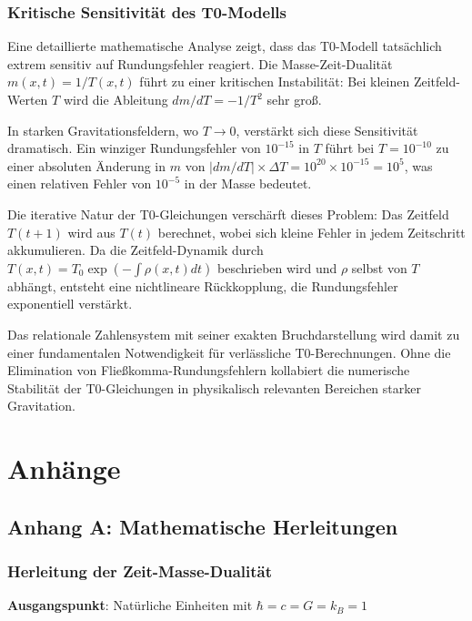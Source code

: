 \documentclass[12pt,a4paper]{report}
\begin{document}
	\subsection{Kritische Sensitivit{\"a}t des T0-Modells}
	
	Eine detaillierte mathematische Analyse zeigt, dass das T0-Modell tats{\"a}chlich extrem sensitiv auf Rundungsfehler reagiert. Die Masse-Zeit-Dualit{\"a}t $m(x,t) = 1/T(x,t)$ f{\"u}hrt zu einer kritischen Instabilit{\"a}t: Bei kleinen Zeitfeld-Werten $T$ wird die Ableitung $dm/dT = -1/T^2$ sehr gro{\ss}.
	
	In starken Gravitationsfeldern, wo $T \to 0$, verst{\"a}rkt sich diese Sensitivit{\"a}t dramatisch. Ein winziger Rundungsfehler von $10^{-15}$ in $T$ f{\"u}hrt bei $T = 10^{-10}$ zu einer absoluten {\"A}nderung in $m$ von $|dm/dT| \times \Delta T = 10^{20} \times 10^{-15} = 10^5$, was einen relativen Fehler von $10^{-5}$ in der Masse bedeutet.
	
	Die iterative Natur der T0-Gleichungen versch{\"a}rft dieses Problem: Das Zeitfeld $T(t+1)$ wird aus $T(t)$ berechnet, wobei sich kleine Fehler in jedem Zeitschritt akkumulieren. Da die Zeitfeld-Dynamik durch $T(x,t) = T_0 \exp(-\int\rho(x,t)dt)$ beschrieben wird und $\rho$ selbst von $T$ abh{\"a}ngt, entsteht eine nichtlineare R{\"u}ckkopplung, die Rundungsfehler exponentiell verst{\"a}rkt.
	
	Das relationale Zahlensystem mit seiner exakten Bruchdarstellung wird damit zu einer fundamentalen Notwendigkeit f{\"u}r verl{\"a}ssliche T0-Berechnungen. Ohne die Elimination von Flie{\ss}komma-Rundungsfehlern kollabiert die numerische Stabilit{\"a}t der T0-Gleichungen in physikalisch relevanten Bereichen starker Gravitation.
	\chapter{Anhänge}
	
	\section{Anhang A: Mathematische Herleitungen}
	
	\subsection{Herleitung der Zeit-Masse-Dualität}
	
	\textbf{Ausgangspunkt}: Natürliche Einheiten mit $\hbar = c = G = k_B = 1$
	
\end{document}
